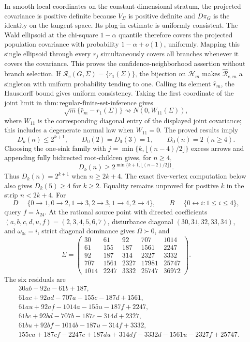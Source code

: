 In smooth local coordinates on the constant-dimensional stratum, the projected covariance is positive definite because \(V_\Sigma\) is positive definite and \(D\pi_G\) is the identity on the tangent space. Its plug-in estimate is uniformly consistent. The Wald ellipsoid at the chi-square \(1-\alpha\) quantile therefore covers the projected population covariance with probability \(1-\alpha+o(1)\), uniformly. Mapping this single ellipsoid through every \(r_j\) simultaneously covers all branches whenever it covers the covariance. This proves the confidence-neighborhood assertion without branch selection.
If \(\mathcal R_e(G,\Sigma)=\{r_1(\Sigma)\}\), the bijection on \(\mathcal H_m\) makes \(\widehat{\mathcal R}_{e,m}\) a singleton with uniform probability tending to one. Calling its element \(\widehat r_m\), the Hausdorff bound gives uniform consistency. Taking the first coordinate of the joint limit in \(\mathrm{thm:regular\mbox{-}finite\mbox{-}set\mbox{-}inference}\) gives
\[
\sqrt m\{\widehat r_m-r_1(\Sigma)\}\rightsquigarrow N(0,W_{11}(\Sigma)),
\]
where \(W_{11}\) is the corresponding diagonal entry of the displayed joint covariance; this includes a degenerate normal law when \(W_{11}=0\).
The proved results imply
\[
D_k(n)\le2^{k+1},\qquad
D_0(2)=D_0(3)=1,\qquad D_0(n)=2\ (n\ge4).
\]
Choosing the one-sink family with \(j=\min\{k,\lfloor(n-4)/2\rfloor\}\) excess arrows and appending fully bidirected root-children gives, for \(n\ge4\),
\[
D_k(n)\ge2^{\min\{k+1,\lfloor(n-2)/2\rfloor\}}.
\]
Thus \(D_k(n)=2^{k+1}\) when \(n\ge2k+4\). The exact five-vertex computation below also gives \(D_k(5)\ge4\) for \(k\ge2\). Equality remains unproved for positive \(k\) in the strip \(n<2k+4\).
For
\[
D=\{0\to1,0\to2,1\to3,2\to3,1\to4,2\to4\},\qquad
B=\{0\leftrightarrow i:1\le i\le4\},
\]
query \(f=\lambda_{24}\). At the rational source point with directed coefficients \((a,b,c,d,u,f)=(2,3,4,5,6,7)\), disturbance diagonal \((30,31,32,33,34)\), and \(\omega_{0i}=i\), strict diagonal dominance gives \(\Omega\succ0\), and
\[
\Sigma=\begin{pmatrix}
30&61&92&707&1014\\
61&155&187&1561&2247\\
92&187&314&2327&3332\\
707&1561&2327&17981&25747\\
1014&2247&3332&25747&36972
\end{pmatrix}.
\]
The six residuals are
\[
\begin{aligned}
&30ab-92a-61b+187,\\
&61ac+92ad-707a-155c-187d+1561,\\
&61au+92af-1014a-155u-187f+2247,\\
&61bc+92bd-707b-187c-314d+2327,\\
&61bu+92bf-1014b-187u-314f+3332,\\
&155cu+187cf-2247c+187du+314df-3332d-1561u-2327f+25747.
\end{aligned}
\]
